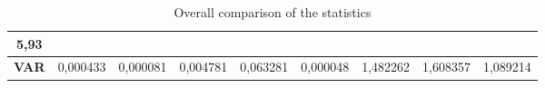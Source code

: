 \begin{landscape}
\begin{table}[H]
{\begin{tabular}{lcccccccc}
  \multicolumn{1}{c|}{{\color[HTML]{595959} 5,93}} \\ \hline
\multicolumn{1}{|l|}{\textbf{VAR}} &
  \multicolumn{1}{c|}{{\color[HTML]{595959} 0,000433}} &
  \multicolumn{1}{c|}{{\color[HTML]{595959} 0,000081}} &
  \multicolumn{1}{c|}{{\color[HTML]{595959} 0,004781}} &
  \multicolumn{1}{c|}{{\color[HTML]{595959} 0,063281}} &
  \multicolumn{1}{c|}{{\color[HTML]{595959} 0,000048}} &
  \multicolumn{1}{c|}{{\color[HTML]{595959} 1,482262}} &
  \multicolumn{1}{c|}{{\color[HTML]{595959} 1,608357}} &
  \multicolumn{1}{c|}{{\color[HTML]{595959} 1,089214}} \\ \hline
\end{tabular}%
}
\caption{Overall comparison of the statistics}
\label{tab:overallcomparison}
\end{table}
\end{landscape}



